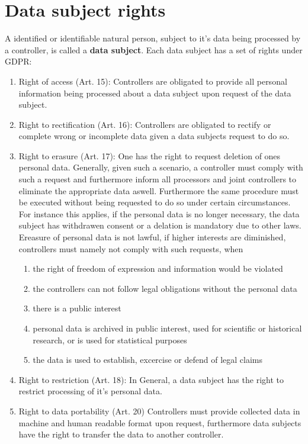 \documentclass[a4paper,12pt]{report}
\begin{document}
	\section{Data subject rights}
	\startsection
	A identified or identifiable natural person, subject to it's data being processed by a controller, is called a \textbf{data subject}.
	Each data subject has a set of rights under GDPR:
	\begin{enumerate}[]
		\item Right of access (Art. 15):
		Controllers are obligated to provide all personal information being processed about a data subject upon request of the data subject.
		\item Right to rectification (Art. 16):
		Controllers are obligated to rectify or complete wrong or incomplete data given a data subjects request to do so.
		\item Right to erasure (Art. 17):
		One has the right to request deletion of ones personal data.
		Generally, given such a scenario, a controller must comply with such a request and furthermore inform all processors and joint controllers to eliminate the appropriate data aswell.
		Furthermore the same procedure must be executed without being requested to do so under certain circumstances.
		For instance this applies, if the personal data is no longer necessary, the data subject has withdrawen consent or a delation is mandatory due to other laws.
		Ereasure of personal data is not lawful, if higher interests are diminished, controllers must namely not comply with such requests, when
		\begin{enumerate}
			\item the right of freedom of expression and information would be violated
			\item the controllers can not follow legal obligations without the personal data
			\item there is a public interest
			\item personal data is archived in public interest, used for scientific or historical research, or is used for statistical purposes
			\item the data is used to establish, excercise or defend of legal claims
		\end{enumerate}
		\item Right to restriction (Art. 18):
		In General, a data subject has the right to restrict processing of it's personal data.
		\item Right to data portability (Art. 20)
		Controllers must provide collected data in machine and human readable format upon request, furthermore data subjects have the right to transfer the data to another controller.

\end{enumerate}
\end{document}
